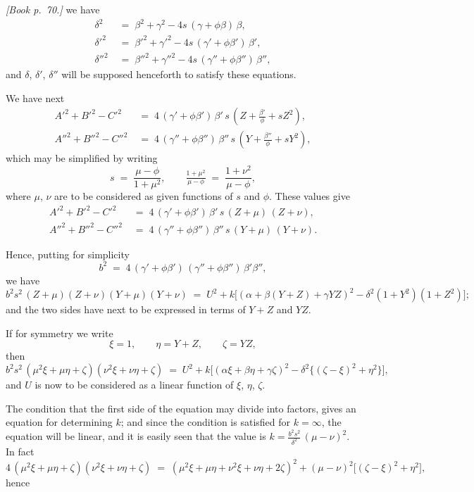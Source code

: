 \documentclass[11pt]{article}
\begin{document}
\bigskip

\noindent\emph{[Book p.~70.]} we have
\begin{align*}
\delta^{2}     &\;=\; \beta^{2} + \gamma^{2} - 4s\,(\gamma + \phi\beta)\,\beta,\\
\delta'^{2}    &\;=\; \beta'^{2} + \gamma'^{2} - 4s\,(\gamma' + \phi\beta')\,\beta',\\
\delta''^{2}   &\;=\; \beta''^{2} + \gamma''^{2} - 4s\,(\gamma'' + \phi\beta'')\,\beta'',
\end{align*}
and $\delta$, $\delta'$, $\delta''$ will be supposed henceforth to satisfy these equations.

We have next
\begin{align*}
A'^{2} + B'^{2} - C'^{2} &\;=\; 4\,(\gamma' + \phi\beta')\,\beta'\,s\,(Z + \tfrac{\beta'}{\phi} + sZ^{2}),\\
A''^{2} + B''^{2} - C''^{2} &\;=\; 4\,(\gamma'' + \phi\beta'')\,\beta''\,s\,(Y + \tfrac{\beta''}{\phi} + sY^{2}),
\end{align*}
which may be simplified by writing
\[
s \;=\; \frac{\mu - \phi}{1 + \mu^{2}},\qquad \tfrac{1 + \mu^{2}}{\mu - \phi} \;=\; \frac{1 + \nu^{2}}{\mu - \phi},
\]
where $\mu$, $\nu$ are to be considered as given functions of $s$ and $\phi$. These values give
\begin{align*}
A'^{2} + B'^{2} - C'^{2} &\;=\; 4\,(\gamma' + \phi\beta')\,\beta'\,s\,(Z + \mu)\,(Z + \nu),\\
A''^{2} + B''^{2} - C''^{2} &\;=\; 4\,(\gamma'' + \phi\beta'')\,\beta''\,s\,(Y + \mu)\,(Y + \nu).
\end{align*}

Hence, putting for simplicity
\[
b^{2} \;=\; 4\,(\gamma' + \phi\beta')\,(\gamma'' + \phi\beta'')\,\beta'\beta'',
\]
we have
\[
b^{2}s^{2}\,(Z + \mu)(Z + \nu)(Y + \mu)(Y + \nu) \;=\; U^{2} + k\bigl[(\alpha + \beta(Y + Z) + \gamma YZ)^{2} - \delta^{2}(1 + Y^{2})(1 + Z^{2})\bigr];
\]
and the two sides have next to be expressed in terms of $Y + Z$ and $YZ$.

If for symmetry we write
\[
\xi = 1,\qquad \eta = Y + Z,\qquad \zeta = YZ,
\]
then
\[
b^{2}s^{2}\,(\mu^{2}\xi + \mu\eta + \zeta)(\nu^{2}\xi + \nu\eta + \zeta) \;=\; U^{2} + k\bigl[(\alpha\xi + \beta\eta + \gamma\zeta)^{2} - \delta^{2}\{(\zeta - \xi)^{2} + \eta^{2}\}\bigr],
\]
and $U$ is now to be considered as a linear function of $\xi$, $\eta$, $\zeta$.

The condition that the first side of the equation may divide into factors, gives an equation for determining $k$; and since the condition is satisfied for $k = \infty$, the equation will be linear, and it is easily seen that the value is $k = \tfrac{b^{2}s^{2}}{\delta^{2}}\,(\mu - \nu)^{2}$. In fact
\[
4\,(\mu^{2}\xi + \mu\eta + \zeta)(\nu^{2}\xi + \nu\eta + \zeta) \;=\; (\mu^{2}\xi + \mu\eta + \nu^{2}\xi + \nu\eta + 2\zeta)^{2} + (\mu - \nu)^{2}\bigl[(\zeta - \xi)^{2} + \eta^{2}\bigr],
\]
hence
\end{document}
